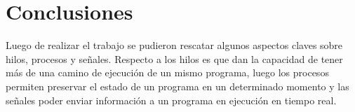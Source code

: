 \section{Conclusiones}
Luego de realizar el trabajo se pudieron rescatar algunos aspectos claves sobre hilos, procesos y señales. Respecto a los hilos es que dan la capacidad de tener más de una camino de ejecución de un mismo programa, luego los procesos permiten preservar el estado de un programa en un determinado momento y las señales poder enviar información a un programa en ejecución en tiempo real.
\\